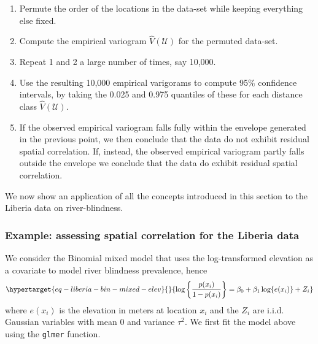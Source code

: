\documentclass[
  letterpaper,
]{krantz}
\begin{document}
\begin{enumerate}
\def\labelenumi{\arabic{enumi}.}
\item
  Permute the order of the locations in the data-set while keeping
  everything else fixed.
\item
  Compute the empirical variogram \(\hat{V}(\mathcal{U})\) for the
  permuted data-set.
\item
  Repeat 1 and 2 a large number of times, say 10,000.
\item
  Use the resulting 10,000 empirical varigorams to compute 95\(\%\)
  confidence intervals, by taking the 0.025 and 0.975 quantiles of these
  for each distance class \(\hat{V}(\mathcal{U})\).
\item
  If the observed empirical variogram falls fully within the envelope
  generated in the previous point, we then conclude that the data do not
  exhibit residual spatial correlation. If, instead, the observed
  empirical variogram partly falls outside the envelope we conclude that
  the data do exhibit residual spatial correlation.
\end{enumerate}

We now show an application of all the concepts introduced in this
section to the Liberia data on river-blindness.

\hypertarget{sec-empirical-variog-bin}{%
\subsubsection{Example: assessing spatial correlation for the Liberia
data}\label{sec-empirical-variog-bin}}

We consider the Binomial mixed model that uses the log-transformed
elevation as a covariate to model river blindness prevalence, hence
\begin{equation}\protect\hypertarget{eq-liberia-bin-mixed-elev}{}{
\log\left\{\frac{p(x_i)}{1-p(x_i)}\right\} = \beta_{0} + \beta_{1}\log\{e(x_i)\} + Z_i
}\label{eq-liberia-bin-mixed-elev}\end{equation} where \(e(x_i)\) is the
elevation in meters at location \(x_i\) and the \(Z_i\) are i.i.d.
Gaussian variables with mean 0 and variance \(\tau^2\). We first fit the
model above using the \texttt{glmer} function.
\end{document}
